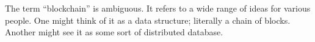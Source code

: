 The term ``blockchain'' is ambiguous.
It refers to a wide range of ideas for various people.
One might think of it as a data structure; literally a chain of blocks.
Another might see it as some sort of distributed database.
